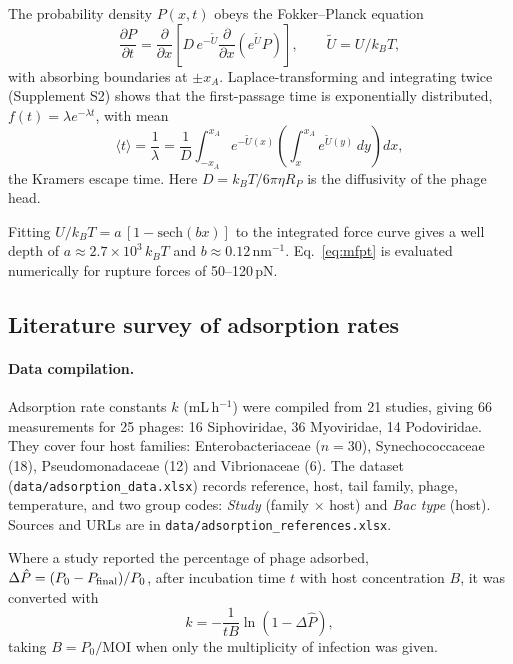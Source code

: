 \documentclass[12pt]{article}
\begin{document}
The probability density $P(x,t)$ obeys the Fokker--Planck equation
\begin{equation}
\frac{\partial P}{\partial t}=\frac{\partial}{\partial x}\left[D\,e^{-\tilde U}\frac{\partial}{\partial x}\left(e^{\tilde U}P\right)\right],\qquad \tilde U=U/k_BT,
\end{equation}
with absorbing boundaries at $\pm x_A$. Laplace-transforming and integrating twice (Supplement S2) shows that the first-passage time is exponentially distributed, $f(t)=\lambda e^{-\lambda t}$, with mean
\begin{equation}\label{eq:mfpt}
\langle t\rangle=\frac{1}{\lambda}=\frac1D\int_{-x_A}^{x_A}e^{-\tilde U(x)}\left(\int_{x}^{x_A}e^{\tilde U(y)}\,dy\right)dx ,
\end{equation}
the Kramers escape time\cite{kramers1940brownian,zwanzig2001nonequilibrium}. Here $D=k_BT/6\pi\eta R_P$ is the diffusivity of the phage head.

Fitting $U/k_BT=a\,[1-\mathrm{sech}(bx)]$ to the integrated force curve gives a well depth of $a\approx2.7\times10^{3}\,k_BT$ and $b\approx0.12$\,nm$^{-1}$. Eq.~\eqref{eq:mfpt} is evaluated numerically for rupture forces of 50--120\,pN.

\subsection*{Literature survey of adsorption rates}
\paragraph{Data compilation.} Adsorption rate constants $k$ (mL\,h$^{-1}$) were compiled from 21 studies, giving 66 measurements for 25 phages: 16 Siphoviridae, 36 Myoviridae, 14 Podoviridae. They cover four host families: Enterobacteriaceae ($n=30$), Synechococcaceae (18), Pseudomonadaceae (12) and Vibrionaceae (6). The dataset (\texttt{data/adsorption\_data.xlsx}) records reference, host, tail family, phage, temperature, and two group codes: \emph{Study} (family $\times$ host) and \emph{Bac type} (host). Sources and URLs are in \texttt{data/adsorption\_references.xlsx}.

Where a study reported the percentage of phage adsorbed, $\Delta\hat P=(P_0-P_{\rm final})/P_0$, after incubation time $t$ with host concentration $B$, it was converted with
\begin{equation}
k=-\frac{1}{tB}\ln\left(1-\Delta\hat P\right),
\end{equation}
taking $B=P_0/\mathrm{MOI}$ when only the multiplicity of infection was given\cite{abedon2023adsorption}.
\end{document}
